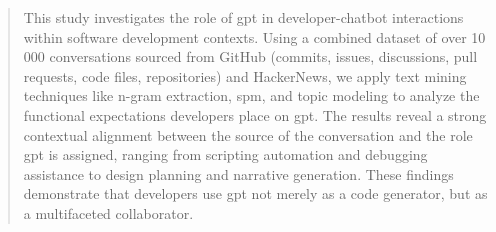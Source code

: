\begin{abstract}
This study investigates the role of \acrfull{gpt} in developer-chatbot interactions within software development contexts. Using a combined dataset of over 10 000 conversations sourced from GitHub (commits, issues, discussions, pull requests, code files, repositories) and HackerNews, we apply text mining techniques like n-gram extraction, \acrfull{spm}, and topic modeling to analyze the functional expectations developers place on \acrshort{gpt}. The results reveal a strong contextual alignment between the source of the conversation and the role \acrshort{gpt} is assigned, ranging from scripting automation and debugging assistance to design planning and narrative generation. These findings demonstrate that developers use \acrshort{gpt} not merely as a code generator, but as a multifaceted collaborator.
\end{abstract}

